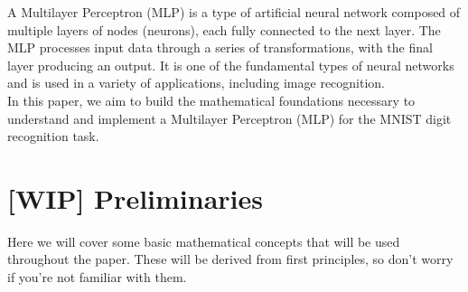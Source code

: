 \documentclass[9pt]{extarticle}
\begin{document}
\vspace{0.4cm}
\noindent A Multilayer Perceptron (MLP) is a type of artificial neural network composed of multiple
layers of nodes (neurons), each fully connected to the next layer. The MLP processes input data through
a series of transformations, with the final layer producing an output. It is one of the fundamental types
of neural networks and is used in a variety of applications, including image recognition. \\[2ex]
In this paper, we aim to build the mathematical foundations necessary to understand and implement a
Multilayer Perceptron (MLP) for the MNIST digit recognition task.

\pagebreak

\tableofcontents

\pagebreak
\section*{[WIP] Preliminaries}
Here we will cover some basic mathematical concepts that will be used throughout the paper. These will be derived from first principles, so don't worry if you're not familiar with them.
\end{document}
